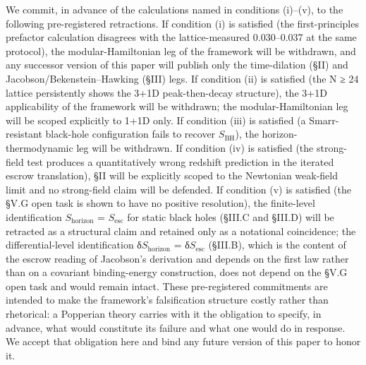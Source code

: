 \documentclass[11pt]{article}
\begin{document}
We commit, in advance of the calculations named in conditions (i)--(v),
to the following pre-registered retractions. If condition (i) is
satisfied (the first-principles prefactor calculation disagrees with the
lattice-measured 0.030--0.037 at the same protocol), the
modular-Hamiltonian leg of the framework will be withdrawn, and any
successor version of this paper will publish only the time-dilation
(§II) and Jacobson/Bekenstein--Hawking (§III) legs. If condition (ii) is
satisfied (the N ≥ 24 lattice persistently shows the 3+1D
peak-then-decay structure), the 3+1D applicability of the framework will
be withdrawn; the modular-Hamiltonian leg will be scoped explicitly to
1+1D only. If condition (iii) is satisfied (a Smarr-resistant black-hole
configuration fails to recover $S_{\mathrm{BH}}$), the horizon-thermodynamic leg will
be withdrawn. If condition (iv) is satisfied (the strong-field test
produces a quantitatively wrong redshift prediction in the iterated
escrow translation), §II will be explicitly scoped to the Newtonian
weak-field limit and no strong-field claim will be defended. If
condition (v) is satisfied (the §V.G open task is shown to have no
positive resolution), the finite-level identification $S_{\mathrm{horizon}}$ = $S_{\mathrm{esc}}$
for static black holes (§III.C and §III.D) will be retracted as a
structural claim and retained only as a notational coincidence; the
differential-level identification δ$S_{\mathrm{horizon}}$ = δ$S_{\mathrm{esc}}$ (§III.B), which is
the content of the escrow reading of Jacobson's derivation and depends
on the first law rather than on a covariant binding-energy construction,
does not depend on the §V.G open task and would remain intact. These
pre-registered commitments are intended to make the framework's
falsification structure costly rather than rhetorical: a Popperian
theory carries with it the obligation to specify, in advance, what would
constitute its failure and what one would do in response. We accept that
obligation here and bind any future version of this paper to honor it.
\end{document}
